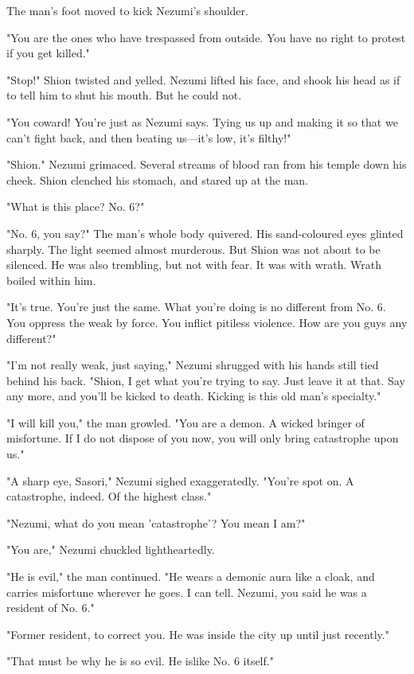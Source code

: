 The man's foot moved to kick Nezumi's shoulder.

"You are the ones who have trespassed from outside. You have no right to
protest if you get killed."

"Stop!" Shion twisted and yelled. Nezumi lifted his face, and shook his
head as if to tell him to shut his mouth. But he could not.

"You coward! You're just as Nezumi says. Tying us up and making it so
that we can't fight back, and then beating us---it's low, it's filthy!"

"Shion." Nezumi grimaced. Several streams of blood ran from his temple
down his cheek. Shion clenched his stomach, and stared up at the man.

"What is this place? No. 6?"

"No. 6, you say?" The man's whole body quivered. His sand-coloured eyes
glinted sharply. The light seemed almost murderous. But Shion was not
about to be silenced. He was also trembling, but not with fear. It was
with wrath. Wrath boiled within him.

"It's true. You're just the same. What you're doing is no different from
No. 6. You oppress the weak by force. You inflict pitiless violence. How
are you guys any different?"

"I'm not really weak, just saying," Nezumi shrugged with his hands still
tied behind his back. "Shion, I get what you're trying to say. Just
leave it at that. Say any more, and you'll be kicked to death. Kicking
is this old man's specialty."

"I will kill you," the man growled. "You are a demon. A wicked bringer
of misfortune. If I do not dispose of you now, you will only bring
catastrophe upon us."

"A sharp eye, Sasori," Nezumi sighed exaggeratedly. "You're spot on. A
catastrophe, indeed. Of the highest class."

"Nezumi, what do you mean 'catastrophe'? \el You mean I am?"

"You are," Nezumi chuckled lightheartedly.

"He is evil," the man continued. "He wears a demonic aura like a cloak,
and carries misfortune wherever he goes. I can tell. Nezumi, you said he
was a resident of No. 6."

"Former resident, to correct you. He was inside the city up until just
recently."

"That must be why he is so evil. He is\el like No. 6 itself."

